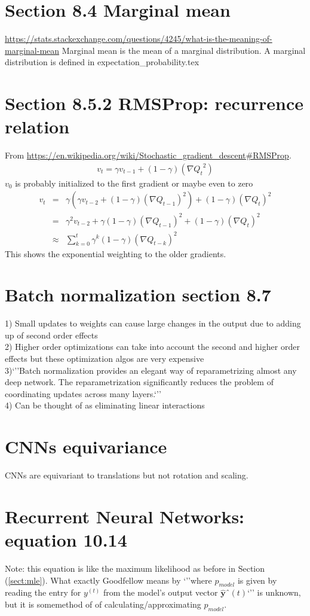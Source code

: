 \documentclass{article}
\newcommand{\ber}{\begin{eqnarray}}
\newcommand{\eer}{\end{eqnarray}}
\begin{document}
\section{Section 8.4 Marginal mean}
\url{https://stats.stackexchange.com/questions/4245/what-is-the-meaning-of-marginal-mean} Marginal mean is the mean of a marginal distribution. A marginal distribution is defined in expectation\_probability.tex
%
%
%
\section{Section 8.5.2 RMSProp: recurrence relation}
From \url{https://en.wikipedia.org/wiki/Stochastic_gradient_descent#RMSProp}.\\
\ber
v_{t} = \gamma{}v_{t-1} + (1-\gamma)(\nabla{Q_t}^2)
\eer
$v_{0}$ is probably initialized to the first gradient or maybe even to zero
\ber
v_{t} &=& \gamma{}(\gamma{}v_{t-2}+(1-\gamma)(\nabla{Q_{t-1}})^2) + (1-\gamma)(\nabla{Q_t})^2\\
&=& \gamma^2v_{t-2} + \gamma(1-\gamma)(\nabla{Q_{t-1}})^2 + (1-\gamma)(\nabla{Q_t})^2\\
&\approx& \sum_{k=0}^{t}\gamma^{k}(1-\gamma)(\nabla{Q_{t-k}})^2
\eer
This shows the exponential weighting to the older gradients.

%
%
%
\section{Batch normalization section 8.7}
1) Small updates to weights can cause large changes in the output due to adding up of second order effects\\
2) Higher order optimizations can take into account the second and higher order effects but these optimization algos are very expensive\\
3)`''Batch normalization provides an elegant way of reparametrizing almost any deep
network. The reparametrization significantly reduces the problem of coordinating
updates across many layers.`''\\
4) Can be thought of as eliminating linear interactions
%
%
%
\section{CNNs equivariance}
CNNs are equivariant to translations but not rotation and scaling.
%
%
%
\section{Recurrent Neural Networks: equation 10.14}
Note: this equation is like the maximum likelihood as before in Section (\ref{sect:mle}). What exactly Goodfellow means by `''where $p_{model}$ is given by reading the entry for $y^{(t)}$ from the
model’s output vector $\hat{\pmb{y}}ˆ{(t)}$`'' is unknown, but it is somemethod of of calculating/approximating $p_{model}$.
%
%
%
\end{document}
